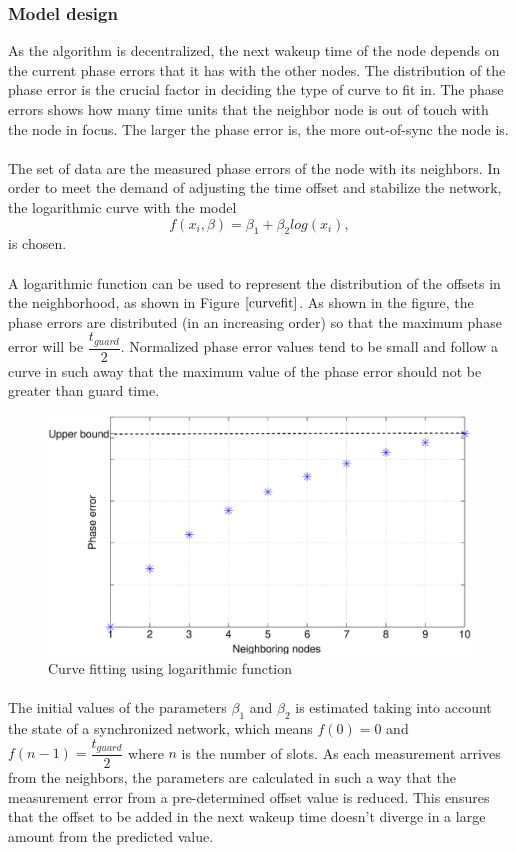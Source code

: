 \documentclass[a4paper,10pt]{report}
\begin{document}
\subsubsection{Model design}
As the algorithm is decentralized, the next wakeup time of the node
depends on the current phase errors that it has with the other
nodes. The distribution of the phase error is the crucial factor in
deciding the type of curve to fit in. The phase errors shows how
many time units that the neighbor node is out of touch with the node
in focus. The larger the phase error is, the more out-of-sync the
node is.\paragraph*{} The set of data are the measured phase errors
of the node with its neighbors. In order to meet the demand of
adjusting the time offset and stabilize the network, the logarithmic
curve with the model
\begin{equation}
 f(x_i,\beta)= \beta _1 + \beta_2log(x_i),
\end{equation}
is chosen. \paragraph*{} A logarithmic function can be used to
represent the distribution of the offsets in the neighborhood, as
shown in Figure $\ref{curvefit}$. As shown in the figure, the phase
errors are distributed (in an increasing order) so that the maximum
phase error will be $\dfrac{t_{guard}}{2}$. Normalized phase error
values tend to be small and follow a curve in such away that the
maximum value of the phase error should not be greater than guard
time.
\begin{figure}
\centering
\includegraphics[width= 0.6 \textwidth]{curvefit}
\caption{Curve fitting using logarithmic function} \label{curvefit}
\end{figure}
\paragraph*{}
The initial values of the parameters $\beta_1$ and $\beta_2$ is
estimated taking into account the state of a synchronized network,
which means $f(0)=0$ and $f(n-1)=\dfrac{t_{guard}}{2}$ where $n$ is
the number of slots. \newline As each measurement arrives from the
neighbors, the parameters are calculated in such a way that the
measurement error from a pre-determined offset value is reduced.
This ensures that the offset to be added in the next wakeup time
doesn't diverge in a large amount from the predicted value.
\end{document}
